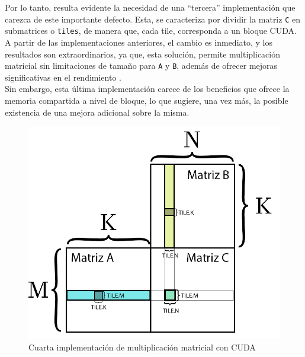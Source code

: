 Por lo tanto, resulta evidente la necesidad de una ``tercera'' implementación que carezca de este importante defecto. Esta, se caracteriza por dividir la matriz \texttt{C} en submatrices o \texttt{tiles}, de manera que, cada tile, corresponda a un bloque CUDA. A partir de las implementaciones anteriores, el cambio es inmediato, y los resultados son extraordinarios, ya que, esta solución, permite multiplicación matricial sin limitaciones de tamaño para \texttt{A} y \texttt{B}, además de ofrecer mejoras significativas en el rendimiento \cite{cuda_mult_matrix_v3}. \\
Sin embargo, esta última implementación carece de los beneficios que ofrece la memoria compartida a nivel de bloque, lo que sugiere, una vez más, la posible existencia de una mejora adicional sobre la misma. \\

\begin{figure}[H]
	\centering
	\includegraphics[scale=0.3]{imagenes/gemm_tile_v4.jpg}  
	\caption{Cuarta implementación de multiplicación matricial con CUDA}
	\label{fig:mult_matrix_cuda_v4}
\end{figure}

